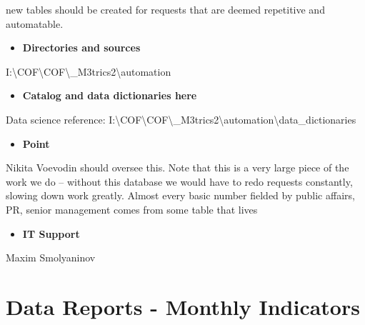 \documentclass[
]{book}
\newenvironment{Shaded}{\begin{snugshade}}{\end{snugshade}}
\newcommand{\NormalTok}[1]{#1}
\newcommand{\SpecialCharTok}[1]{\textcolor[rgb]{0.00,0.00,0.00}{#1}}
\providecommand{\tightlist}{%
  \setlength{\itemsep}{0pt}\setlength{\parskip}{0pt}}
\begin{document}
new tables should be created for requests that are deemed repetitive and automatable.

\begin{itemize}
\tightlist
\item
  \textbf{Directories and sources}
\end{itemize}

\begin{Shaded}
\begin{Highlighting}[]
\NormalTok{I}\SpecialCharTok{:}\NormalTok{\textbackslash{}COF\textbackslash{}COF\textbackslash{}\_M3trics2\textbackslash{}automation }
\end{Highlighting}
\end{Shaded}

\begin{itemize}
\tightlist
\item
  \textbf{Catalog and data dictionaries here}
\end{itemize}

\begin{Shaded}
\begin{Highlighting}[]
\NormalTok{Data science reference}\SpecialCharTok{:}\NormalTok{ I}\SpecialCharTok{:}\NormalTok{\textbackslash{}COF\textbackslash{}COF\textbackslash{}\_M3trics2\textbackslash{}automation\textbackslash{}data\_dictionaries }
\end{Highlighting}
\end{Shaded}

\begin{itemize}
\tightlist
\item
  \textbf{Point}
\end{itemize}

Nikita Voevodin should oversee this. Note that this is a very large piece of the work we do -- without this database we would have to redo requests constantly, slowing down work greatly. Almost every basic number fielded by public affairs, PR, senior management comes from some table that lives

\begin{itemize}
\tightlist
\item
  \textbf{IT Support}
\end{itemize}

Maxim Smolyaninov

\hypertarget{data-reports---monthly-indicators}{%
\section{Data Reports - Monthly Indicators}\label{data-reports---monthly-indicators}}
\end{document}
